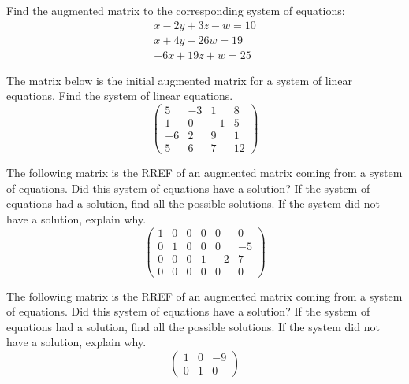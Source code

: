 \documentclass[11pt,letterpaper]{article}
\begin{document}

 Find the augmented matrix to the corresponding system of equations:
	\[
	\begin{gathered}
	x - 2y + 3z - w= 10 \\
	x + 4y - 26w= 19 \\
	-6x + 19z + w= 25
	\end{gathered}
	\] \pspace

\sol 



\newpage



 The matrix below is the initial augmented matrix for a system of linear equations. Find the system of linear equations. 
	\[
	\begin{pmatrix}
	5 & -3 & 1 & 8 \\
	1 & 0 & -1 & 5 \\
	-6 & 2 & 9 & 1 \\
	5 & 6 & 7 & 12
	\end{pmatrix}
	\] \pspace

\sol 



\newpage



 The following matrix is the RREF of an augmented matrix coming from a system of equations. Did this system of equations have a solution? If the system of equations had a solution, find all the possible solutions. If the system did not have a solution, explain why. 
	\[
	\begin{pmatrix}
	1 & 0 & 0 & 0 & 0 & 0 \\
	0 & 1 & 0 & 0 & 0 & -5 \\
	0 & 0 & 0 & 1 & -2 & 7 \\
	0 & 0 & 0 & 0 & 0 & 0 
	\end{pmatrix}
	\] \pspace

\sol 



\newpage



 The following matrix is the RREF of an augmented matrix coming from a system of equations. Did this system of equations have a solution? If the system of equations had a solution, find all the possible solutions. If the system did not have a solution, explain why. 
	\[
	\begin{pmatrix}
	1 & 0 & -9 \\
	0 & 1 & 0 
	\end{pmatrix}
	\] \pspace
\end{document}
